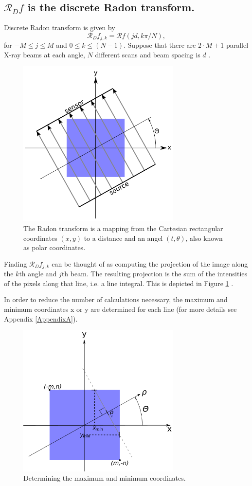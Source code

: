 \subsection{$\mathscr{R}_Df$ is the discrete Radon transform.}
Discrete Radon transform is given by
$$
\mathscr{R}_D f_{j,k} = \mathscr{R}f (jd,k\pi/N),
$$
for $-M \leq j \leq M$ and $0 \leq k \leq (N-1)$. Suppose that there are $2\cdot M + 1$ parallel X-ray beams at each angle, $N$ different scans and beam spacing is $d$ .\\
\begin{figure}[H]
	\centering
		\includegraphics[width=230pt]{Figures/radon.png}
	\caption[Radon transform]{The Radon transform is a mapping from the Cartesian rectangular coordinates $(x,y)$ to a distance and an angel $(t, \theta)$, also known as polar coordinates.}
	\label{fig:radon}
\end{figure}

Finding $\mathscr{R}_D f_{j,k}$ can be thought of as computing the projection of the image along the $k$th angle and $j$th beam. The resulting projection is the sum of the intensities of the pixels along that line, i.e. a line integral. This is depicted in Figure \ref{fig:radon} \cite{Radon}.  

In order to reduce the number of calculations necessary, the maximum and minimum coordinates x or y are determined for each line (for more details see Appendix \ref{AppendixA}). 

\begin{figure}[H]
	\centering
		\includegraphics[width=230pt]{Figures/minmax.png}
	\caption[Maximum and minimum coordinates of x or y.]{Determining the maximum and minimum coordinates.}
	\label{fig:minmax}
\end{figure}



